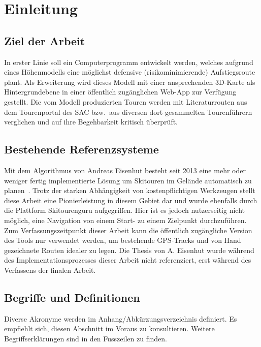 
\section{Einleitung}

\subsection{Ziel der Arbeit}

In erster Linie soll ein Computerprogramm entwickelt werden, welches aufgrund eines Höhenmodells eine möglichst defensive (risikominimierende) Aufstiegsroute plant. Als Erweiterung wird dieses Modell mit einer ansprechenden 3D-Karte als Hintergrundebene in einer öffentlich zugänglichen Web-App zur Verfügung gestellt. Die vom Modell produzierten Touren werden mit Literaturrouten aus dem Tourenportal des SAC bzw.\ aus diversen dort gesammelten Tourenführern verglichen und auf ihre Begehbarkeit kritisch überprüft.

\subsection{Bestehende Referenzsysteme}

Mit dem Algorithmus von Andreas Eisenhut besteht seit 2013 eine mehr oder weniger fertig implementierte Lösung um Skitouren im Gelände automatisch zu planen\ \cite{eisenhuttourknopfdruck}. Trotz der starken Abhängigkeit von kostenpflichtigen Werkzeugen stellt diese Arbeit eine Pionierleistung in diesem Gebiet dar und wurde ebenfalls durch die Plattform Skitourenguru aufgegriffen. Hier ist es jedoch nutzerseitig nicht möglich, eine Navigation von einem Start- zu einem Zielpunkt durchzuführen. Zum Verfassungszeitpunkt dieser Arbeit kann die öffentlich zugängliche Version des Tools nur verwendet werden, um bestehende GPS-Tracks und von Hand gezeichnete Routen idealer zu legen. Die Thesis von A. Eisenhut wurde während des Implementationsprozesses dieser Arbeit nicht referenziert, erst während des Verfassens der finalen Arbeit.

\subsection{Begriffe und Definitionen}

Diverse Akronyme werden im Anhang/Abkürzungsverzeichnis definiert. Es empfiehlt sich, diesen Abschnitt im Voraus zu konsultieren. Weitere Begriffserklärungen sind in den Fusszeilen zu finden.

